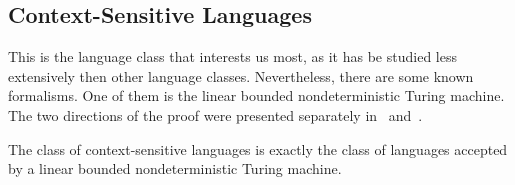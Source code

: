 \subsection{Context-Sensitive Languages}\label{subsec:des-context-sensitive-languages}

This is the language class that interests us most, as it has be studied less extensively then other language classes.
Nevertheless, there are some known formalisms.
One of them is the linear bounded nondeterministic Turing machine.
The two directions of the proof were presented separately in~\cite{Kuroda1964} and~\cite{Landweber1963}.

\begin{theorem}\label{thm:nspacecontextsensitive}
    The class of context-sensitive languages is exactly the class of languages accepted by a linear bounded nondeterministic Turing machine.
\end{theorem}

